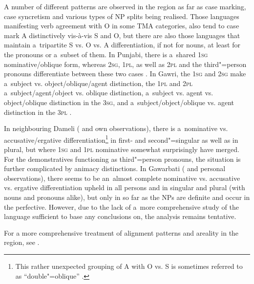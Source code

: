A number of different patterns are observed in the region as far as case marking, case syncretism and various types of NP splits being realised. Those languages manifesting verb agreement with O in some TMA categories, also tend to case mark A distinctively vis-à-vis S and O, but there are also those languages that maintain a~tripartite S vs. O vs. A differentiation, if not for nouns, at least for the pronouns or a~subset of them. In Punjabi, there is a~shared \textsc{1sg} nominative/oblique form, whereas \textsc{2sg}, \textsc{1pl}, as well as \textsc{2pl} and the third"=person pronouns differentiate between these two cases \citep[229]{bhatia1993}. In Gawri, the \textsc{1sg} and \textsc{2sg} make a~subject vs. object/oblique/agent distinction, the \textsc{1pl} and \textsc{2pl} a~subject/agent/object vs. oblique distinction, a~subject vs. agent vs. object/oblique distinction in the \textsc{3sg}, and a~subject/object/oblique vs. agent distinction in the \textsc{3pl} \citep[39]{baart1999a}. 



In neighbouring Dameli (\citealt{morgenstierne1942} and own observations), there is a~nominative vs. accusative/ergative differentiation\footnote{This rather unexpected grouping of A with O vs. S is sometimes referred to as ``double"=oblique'' \citep{payne1980}.} in first- and second"=singular as well as in plural, but where \textsc{1sg} and \textsc{1pl} nominative somewhat surprisingly have merged. For the demonstratives functioning as third"=person pronouns, the situation is further complicated by animacy distinctions. In Gawarbati (\citealt{morgenstierne1950} and personal observations), there seems to be an~almost complete nominative vs. accusative vs. ergative differentiation upheld in all persons and in singular and plural (with nouns and pronouns alike), but only in so far as the NPs are definite and occur in the perfective. However, due to the lack of a~more comprehensive study of the language sufficient to base any conclusions on, the analysis remains tentative. 
 

For a more comprehensive treatment of alignment patterns and areality in the region, see \citet{liljegren2014}. 